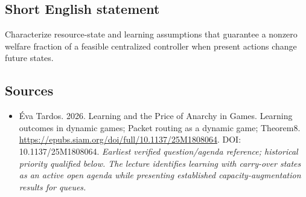 \documentclass[11pt]{article}
\begin{document}
\subsection{Short English statement}
Characterize resource-state and learning assumptions that guarantee a nonzero welfare fraction of a feasible centralized controller when present actions change future states.

\subsection{Sources}
\begin{itemize}\raggedright
\item[\textnormal{[S1]}]\hypertarget{source:30007567:1}{} Éva Tardos. 2026. Learning and the Price of Anarchy in Games. Learning outcomes in dynamic games; Packet routing as a dynamic game; Theorem8.
\url{https://epubs.siam.org/doi/full/10.1137/25M1808064}.
DOI: 10.1137/25M1808064.
{\small\textit{Earliest verified question/agenda reference; historical priority qualified below. The lecture identifies learning with carry-over states as an active open agenda while presenting established capacity-augmentation results for queues.}}
\end{itemize}
\end{document}
